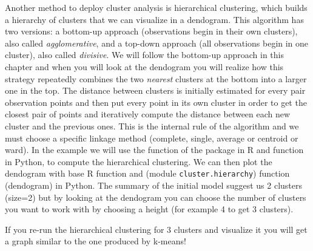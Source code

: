 
Another method to deploy cluster analysis is hierarchical clustering, which builds a hierarchy of clusters that we can visualize in a dendogram.  This algorithm has two versions: a bottom-up approach (observations begin in their own clusters), also called \textit{agglomerative}, and a top-down approach (all observations begin in one cluster), also called \textit{divisive}. We will follow the bottom-up approach in this chapter and when you will look at the dendogram you will realize how this strategy repeatedly combines the two \textit{nearest} clusters at the bottom into a larger one in the top. The distance between clusters is initially estimated for every pair observation points and then put every point in its own cluster in order to get the closest pair of points and iteratively compute the distance between each new cluster and the previous ones. This is the internal rule of the algorithm and we must choose a specific linkage method (complete, single, average or centroid or ward). In the example we will use the function  of the package  in R and  function  in Python, to compute the hierarchical clustering. We can then plot the dendogram  with base R function  and  (module \texttt{cluster.hierarchy}) function \fn(dendogram) in Python. The summary of the initial model suggest us 2 clusters (size=2) but by looking at the dendogram you can choose the number of clusters you want to work with by choosing a height (for example 4 to get 3 clusters). 


If you re-run the hierarchical clustering for 3 clusters and visualize it you will get a graph similar to the one produced by k-means!


